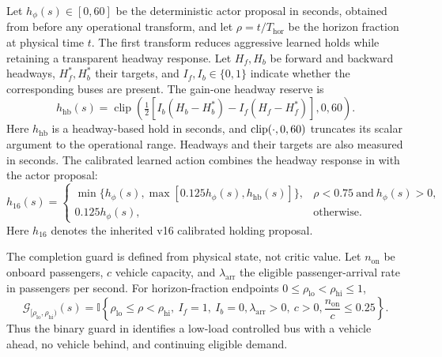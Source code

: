 Let $h_{\phi}(s)\in[0,60]$ be the deterministic actor proposal in seconds,
obtained from  before any operational transform, and let
$\rho=t/T_{\mathrm{hor}}$ be the horizon fraction at physical time $t$.
The first transform reduces
aggressive learned holds while retaining a transparent headway response. Let
$H_f,H_b$ be forward and backward headways, $H_f^*,H_b^*$ their targets, and
$I_f,I_b\in\{0,1\}$ indicate whether the corresponding buses are present. The
gain-one headway reserve is
\begin{equation}
h_{\mathrm{hb}}(s)=
\operatorname{clip}\left(
\tfrac{1}{2}\left[I_b(H_b-H_b^*)-I_f(H_f-H_f^*)\right],0,60
\right).
\label{eq:headway_reserve}
\end{equation}
Here $h_{\mathrm{hb}}$ is a headway-based hold in seconds, and
$\operatorname{clip}(\cdot,0,60)$ truncates its scalar argument to
the operational range. Headways and their targets are also measured in seconds.
The calibrated learned action combines the headway response in
 with the actor proposal:
\begin{equation}
h_{16}(s)=
\begin{cases}
\min\{h_{\phi}(s),\max[0.125h_{\phi}(s),h_{\mathrm{hb}}(s)]\},
& \rho<0.75\ \text{and}\ h_{\phi}(s)>0,\\
0.125h_{\phi}(s), & \text{otherwise}.
\end{cases}
\label{eq:v16_transform}
\end{equation}
Here $h_{16}$ denotes the inherited v16 calibrated holding proposal.

The completion guard is defined from physical state, not critic value. Let
$n_{\mathrm{on}}$ be onboard passengers, $c$ vehicle capacity, and
$\lambda_{\mathrm{arr}}$ the eligible passenger-arrival rate in passengers
per second. For horizon-fraction endpoints
$0\leq\rho_{\mathrm{lo}}<\rho_{\mathrm{hi}}\leq1$,
\begin{equation}
\mathcal{G}_{[\rho_{\mathrm{lo}},\rho_{\mathrm{hi}})}(s)=
\mathbb{I}\left\{
\rho_{\mathrm{lo}}\leq\rho<\rho_{\mathrm{hi}},\ I_f=1,\ I_b=0,\lambda_{\mathrm{arr}}>0,
\ c>0,\frac{n_{\mathrm{on}}}{c}\leq0.25
\right\}.
\label{eq:completion_guard}
\end{equation}
Thus the binary guard in  identifies a low-load controlled bus with a vehicle ahead, no
vehicle behind, and continuing eligible demand.

